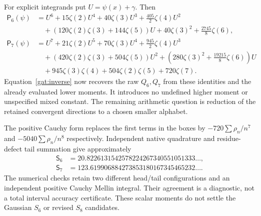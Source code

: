 For explicit integrands put $U=\psi(x)+\gamma$.  Then
\begin{align*}
 \mathsf P_6(\psi)&=U^6+15\zeta(2)U^4+40\zeta(3)U^3
       +\frac{405}{2}\zeta(4)U^2\\
 &\quad +(120\zeta(2)\zeta(3)+144\zeta(5))U
       +40\zeta(3)^2+\frac{2745}{8}\zeta(6),\\
 \mathsf P_7(\psi)&=U^7+21\zeta(2)U^5+70\zeta(3)U^4
       +\frac{945}{2}\zeta(4)U^3\\
 &\quad +(420\zeta(2)\zeta(3)+504\zeta(5))U^2
       +\left(280\zeta(3)^2+\frac{19215}{8}\zeta(6)\right)U\\
 &\quad +945\zeta(3)\zeta(4)+504\zeta(2)\zeta(5)+720\zeta(7).
\end{align*}
Equation~\eqref{gat:inverse} now recovers the raw $Q_6,Q_7$ from
these identities and the already evaluated lower moments.  It
introduces no undefined higher moment or unspecified mixed constant.
The remaining arithmetic question is reduction of the retained
convergent directions to a chosen smaller alphabet.

The positive Cauchy form replaces the first terms in the boxes by
$-720\sum\rho_n/n^7$ and $-5040\sum\rho_n/n^8$ respectively.
Independent native quadrature and residue-defect tail summation give
approximately
\[
 \begin{aligned}
 \mathsf S_6&=20.8226131542578224267340551051333\ldots,\\
 \mathsf S_7&=123.619906884273853180167345465232\ldots.
 \end{aligned}
\]
The numerical checks retain two different head/tail configurations and
an independent positive Cauchy Mellin integral.  Their agreement is a
diagnostic, not a total interval accuracy certificate.  These scalar
moments do not settle the Gaussian $S_6$ or revised $S_8$ candidates.
